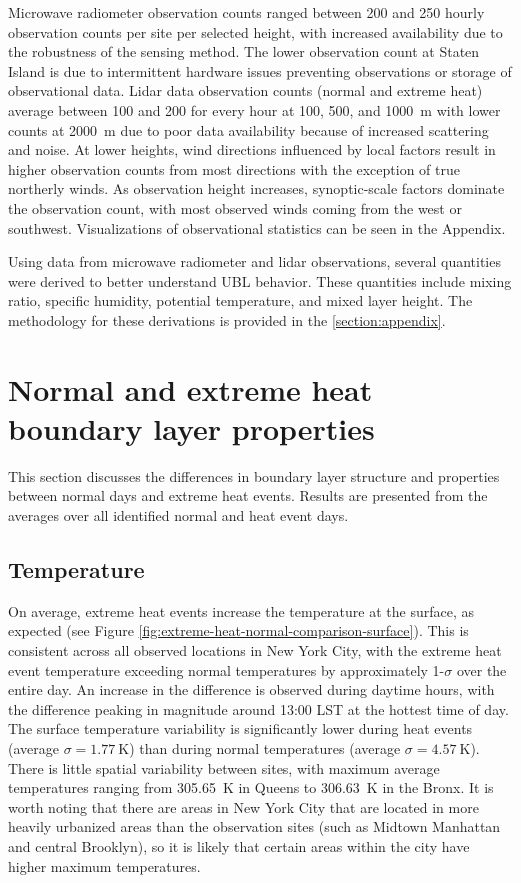 Microwave radiometer observation counts ranged between 200 and 250 hourly observation counts per site per selected height, with increased availability due to the robustness of the sensing method. The lower observation count at Staten Island is due to intermittent hardware issues preventing observations or storage of observational data. Lidar data observation counts (normal and extreme heat) average between 100 and 200 for every hour at 100, 500, and \SI{1000}{\meter} with lower counts at \SI{2000}{\meter} due to poor data availability because of increased scattering and noise. At lower heights, wind directions influenced by local factors result in higher observation counts from most directions with the exception of true northerly winds. As observation height increases, synoptic-scale factors dominate the observation count, with most observed winds coming from the west or southwest. Visualizations of observational statistics can be seen in the Appendix.

Using data from microwave radiometer and lidar observations, several quantities were derived to better understand UBL behavior. These quantities include mixing ratio, specific humidity, potential temperature, and mixed layer height. The methodology for these derivations is provided in the \ref{section:appendix}.

\section{Normal and extreme heat boundary layer properties} \label{section:normal_extreme_properties}
This section discusses the differences in boundary layer structure and properties between normal days and extreme heat events. Results are presented from the averages over all identified normal and heat event days.

\subsection{Temperature}
On average, extreme heat events increase the temperature at the surface, as expected (see Figure \ref{fig:extreme-heat-normal-comparison-surface}). This is consistent across all observed locations in New York City, with the extreme heat event temperature exceeding normal temperatures by approximately 1-$\sigma$ over the entire day. An increase in the difference is observed during daytime hours, with the difference peaking in magnitude around 13:00 LST at the hottest time of day. The surface temperature variability is significantly lower during heat events (average $ \sigma = \SI{1.77}{\kelvin} $) than during normal temperatures (average $ \sigma = \SI{4.57}{\kelvin} $). There is little spatial variability between sites, with maximum average temperatures ranging from \SI{305.65}{\kelvin} in Queens to \SI{306.63}{\kelvin} in the Bronx. It is worth noting that there are areas in New York City that are located in more heavily urbanized areas than the observation sites (such as Midtown Manhattan and central Brooklyn), so it is likely that certain areas within the city have higher maximum temperatures. 

